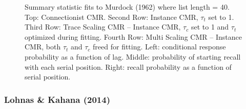 \documentclass[
  letterpaper,
  11pt,
  english,
  singlespacing,
  headsepline]{MastersDoctoralThesis}
\begin{document}
\begin{figure}
\caption{\label{fig-murdock1962memory40}Summary statistic fits to
Murdock (1962) where list length = 40. Top: Connectionist CMR. Second
Row: Instance CMR, \(\tau_{t}\) set to 1. Third Row: Trace Scaling CMR
-- Instance CMR, \(\tau_{c}\) set to 1 and \(\tau_{t}\) optimized during
fitting. Fourth Row: Multi Scaling CMR -- Instance CMR, both \(\tau_t\)
and \(\tau_c\) freed for fitting. Left: conditional response probability
as a function of lag. Middle: probability of starting recall with each
serial position. Right: recall probability as a function of serial
position.}

\end{figure}%

\newpage{}

\subsubsection{Lohnas \& Kahana (2014)}\label{lohnas-kahana-2014}
\end{document}
